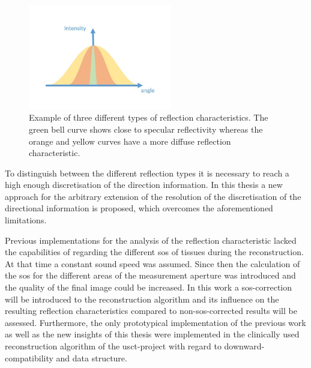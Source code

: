 \begin{figure}[H]
    \centering
    \includegraphics[width=0.56\textwidth]{Graphics/different_reflec_gauss.jpg}
    \caption{Example of three different types of reflection characteristics. The green bell curve shows close to specular reflectivity whereas the orange and yellow curves have a more diffuse reflection characteristic. }
    \label{relfec_chara_examp}
\end{figure}

To distinguish between the different reflection types it is necessary to reach a high enough discretisation of the direction information. In this thesis a new approach for the arbitrary extension of the resolution of the discretisation of the directional information is proposed, which overcomes the aforementioned limitations.

\medskip



Previous implementations for the analysis of the reflection characteristic lacked the capabilities of regarding the different \ac{sos} of tissues during the reconstruction. At that time a constant sound speed was assumed. Since then the calculation of the \ac{sos} for the different areas of the measurement aperture was introduced and the quality of the final image could be increased. In this work a \ac{sos}-correction will be introduced to the reconstruction algorithm and its influence on the resulting reflection characteristics compared to non-\ac{sos}-corrected results will be assessed.
Furthermore, the only prototypical implementation of the previous work as well as the new insights of this thesis were implemented in the clinically used reconstruction algorithm of the \ac{usct}-project with regard to downward-compatibility and data structure.




